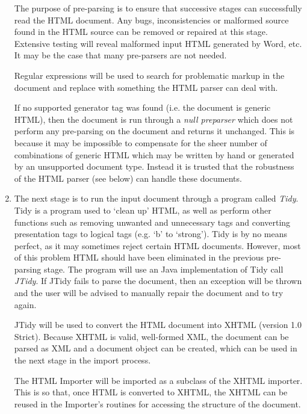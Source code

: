 \begin{enumerate}
The purpose of pre-parsing is to ensure that successive stages can successfully
read the HTML document. Any bugs, inconsistencies or malformed source found in
the HTML source can be removed or repaired at this stage. Extensive testing
will reveal malformed input HTML generated by Word, etc. It may be the case
that many pre-parsers are not needed.

Regular expressions will be used to search for problematic markup in the
document and replace with something the HTML parser can deal with.

If no supported generator tag was found (i.e. the document is generic HTML),
then the document is run through a \emph{null preparser} which does not perform
any pre-parsing on the document and returns it unchanged. This is because it may
be impossible to compensate for the sheer number of combinations of generic
HTML which may be written by hand or generated by an unsupported document type.
Instead it is trusted that the robustness of the HTML parser (see below) can handle
these documents.

\item The next stage is to run the input document through a program called
\emph{Tidy}. Tidy is a program used to `clean up' HTML, as well as perform
other functions such as removing unwanted and unnecessary tags and converting
presentation tags to logical tags (e.g. `b' to `strong'). Tidy is by no means
perfect, as it may sometimes reject certain HTML documents. However, most of
this problem HTML should have been eliminated in the previous pre-parsing stage.
The program will use an Java implementation of Tidy call \emph{JTidy}. 
If JTidy fails to parse the document, then an exception will be thrown and the 
user will be advised to manually repair the document and to try again.

JTidy will be used to convert the HTML document into XHTML (version 1.0
Strict). Because XHTML is valid, well-formed XML, the document can be parsed as
XML and a document object can be created, which can be used in the next stage in the
import process. 

The HTML Importer will be imported as a subclass of the XHTML importer. This is
so that, once HTML is converted to XHTML, the XHTML can be reused in the 
Importer's routines for accessing the structure of the document.

\end{enumerate}

